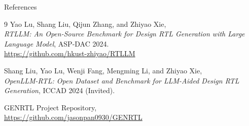 \documentclass[aspectratio=169]{beamer}
\begin{document}
\begin{frame}{References}
\footnotesize
\begin{thebibliography}{9}
Yao Lu, Shang Liu, Qijun Zhang, and Zhiyao Xie, \\
\emph{RTLLM: An Open-Source Benchmark for Design RTL Generation with Large Language Model}, ASP-DAC 2024. \\
\url{https://github.com/hkust-zhiyao/RTLLM}

Shang Liu, Yao Lu, Wenji Fang, Mengming Li, and Zhiyao Xie, \\
\emph{OpenLLM-RTL: Open Dataset and Benchmark for LLM-Aided Design RTL Generation}, ICCAD 2024 (Invited).

GENRTL Project Repository, \\
\url{https://github.com/jasonpan0930/GENRTL}
\end{thebibliography}
\end{frame}
\end{document}
